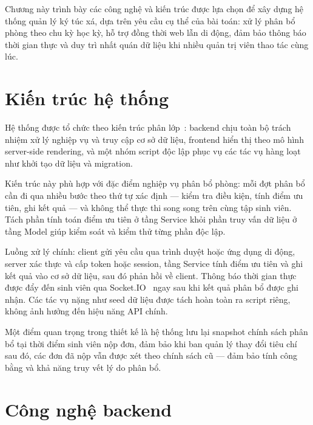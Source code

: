 \documentclass[../DoAn.tex]{subfiles}
\begin{document}
\sloppy

Chương này trình bày các công nghệ và kiến trúc được lựa chọn để xây dựng hệ
thống quản lý ký túc xá, dựa trên yêu cầu cụ thể của bài toán: xử lý phân bổ
phòng theo chu kỳ học kỳ, hỗ trợ đồng thời web lẫn di động, đảm bảo thông báo
thời gian thực và duy trì nhất quán dữ liệu khi nhiều quản trị viên thao tác
cùng lúc.

\section{Kiến trúc hệ thống}
\label{sec:architecture}

Hệ thống được tổ chức theo kiến trúc phân lớp~\cite{fowler2002patterns}: backend
chịu toàn bộ trách nhiệm xử lý nghiệp vụ và truy cập cơ sở dữ liệu, frontend
hiển thị theo mô hình server-side rendering, và một nhóm script độc lập phục vụ
các tác vụ hàng loạt như khởi tạo dữ liệu và migration.

Kiến trúc này phù hợp với đặc điểm nghiệp vụ phân bổ phòng: mỗi đợt phân bổ
cần đi qua nhiều bước theo thứ tự xác định --- kiểm tra điều kiện, tính điểm
ưu tiên, ghi kết quả --- và không thể thực thi song song trên cùng tập sinh
viên. Tách phần tính toán điểm ưu tiên ở tầng Service khỏi phần truy vấn dữ
liệu ở tầng Model giúp kiểm soát và kiểm thử từng phần độc lập.

Luồng xử lý chính: client gửi yêu cầu qua trình duyệt hoặc ứng dụng di động,
server xác thực và cấp token hoặc session, tầng Service tính điểm ưu tiên và
ghi kết quả vào cơ sở dữ liệu, sau đó phản hồi về client. Thông báo thời gian
thực được đẩy đến sinh viên qua Socket.IO~\cite{socketio2024docs} ngay sau khi
kết quả phân bổ được ghi nhận. Các tác vụ nặng như seed dữ liệu được tách hoàn
toàn ra script riêng, không ảnh hưởng đến hiệu năng API chính.

Một điểm quan trọng trong thiết kế là hệ thống lưu lại snapshot chính sách
phân bổ tại thời điểm sinh viên nộp đơn, đảm bảo khi ban quản lý thay đổi
tiêu chí sau đó, các đơn đã nộp vẫn được xét theo chính sách cũ --- đảm bảo
tính công bằng và khả năng truy vết lý do phân bổ.

\section{Công nghệ backend}
\label{sec:backend}
\end{document}
